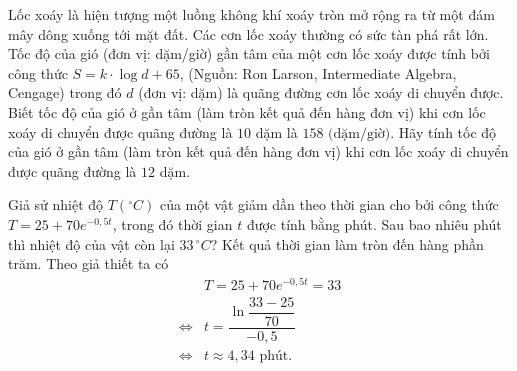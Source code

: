 \begin{bt}%

	Lốc xoáy là hiện tượng một luồng không khí xoáy tròn mở rộng ra từ một đám mây dông xuống tới mặt đất. Các cơn lốc xoáy thường có sức tàn phá rất lớn. Tốc độ của gió (đơn vị: dặm/giờ) gần tâm của một cơn lốc xoáy được tính bởi công thức $S=k\cdot\log d+65$, (Nguồn: Ron Larson, Intermediate Algebra, Cengage) trong đó $d$ (đơn vị: dặm) là quãng đường cơn lốc xoáy di chuyển được. Biết  tốc độ của gió ở gần tâm (làm tròn kết quả đến hàng đơn vị) khi cơn lốc xoáy di chuyển được quãng đường là $ 10 $ dặm là $ 158\text { (dặm/giờ)} $. Hãy tính tốc độ của gió ở gần tâm (làm tròn kết quả đến hàng đơn vị) khi cơn lốc xoáy di chuyển được quãng đường là $ 12 $ dặm.
\end{bt}

\begin{bt}%

	Giả sử nhiệt độ $T({}^\circ C)$ của một vật giảm dần theo thời gian cho bởi công thức $T = 25 + 70e^{-0{,}5t}$, trong đó thời gian $t$ được tính bằng phút. Sau bao nhiêu phút thì nhiệt độ của vật còn lại $33\, {}^\circ C$? Kết quả thời gian làm tròn đến hàng phần trăm.
	\loigiai
	{
		Theo giả thiết ta có
		\begin{align*}
			&T = 25 + 70e^{-0{,}5t} = 33\\
			\Leftrightarrow &t = \dfrac{\ln\dfrac{33-25}{70}}{-0{,}5}\\
			\Leftrightarrow &t \approx 4{,}34 \text{ phút}.
		\end{align*}
	}
\end{bt}

